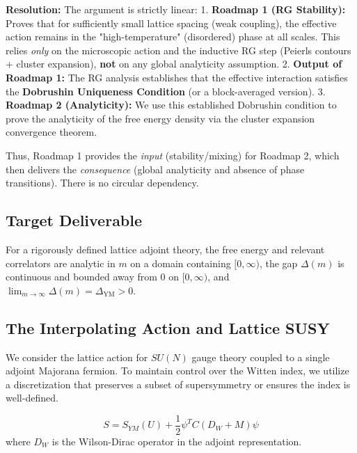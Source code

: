 \textbf{Resolution:} The argument is strictly linear:
1. \textbf{Roadmap 1 (RG Stability):} Proves that for sufficiently small lattice spacing (weak coupling), the effective action remains in the "high-temperature" (disordered) phase at all scales. This relies \textit{only} on the microscopic action and the inductive RG step (Peierls contours + cluster expansion), \textbf{not} on any global analyticity assumption.
2. \textbf{Output of Roadmap 1:} The RG analysis establishes that the effective interaction satisfies the \textbf{Dobrushin Uniqueness Condition} (or a block-averaged version).
3. \textbf{Roadmap 2 (Analyticity):} We use this established Dobrushin condition to prove the analyticity of the free energy density via the cluster expansion convergence theorem.

Thus, Roadmap 1 provides the \textit{input} (stability/mixing) for Roadmap 2, which then delivers the \textit{consequence} (global analyticity and absence of phase transitions). There is no circular dependency.

\subsection{Target Deliverable}
\begin{theorem}
For a rigorously defined lattice adjoint theory, the free energy and relevant correlators are analytic in $m$ on a domain containing $[0,\infty)$, the gap $\Delta(m)$ is continuous and bounded away from 0 on $[0,\infty)$, and $\lim_{m\to\infty}\Delta(m)=\Delta_{\mathrm{YM}}>0$.
\end{theorem}

\subsection{The Interpolating Action and Lattice SUSY}

We consider the lattice action for $SU(N)$ gauge theory coupled to a single adjoint Majorana fermion.
To maintain control over the Witten index, we utilize a discretization that preserves a subset of supersymmetry or ensures the index is well-defined.

\begin{definition}
\begin{equation}
S = S_{YM}(U) + \frac{1}{2} \psi^T C (D_W + M) \psi
\end{equation}
where $D_W$ is the Wilson-Dirac operator in the adjoint representation.
\end{definition}

